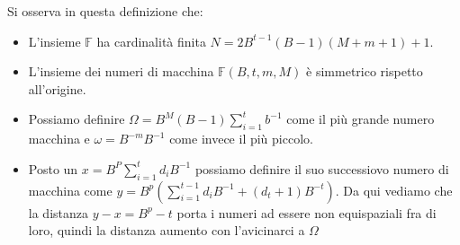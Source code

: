 \hspace{-15pt}Si osserva in questa definizione che:
\begin{itemize}
    \item L'insieme \(\mathbb{F}\) ha cardinalità finita \(N = 2B^{t-1}(B-1)(M + m + 1) + 1\).
    \item L'insieme dei numeri di macchina \(\mathbb{F}(B, t, m, M)\) è simmetrico rispetto all'origine.
    \item Possiamo definire \(\Omega = B^M (B-1) \sum_{i=1}^{t} b^{-1}\) come il più grande numero macchina e \(\omega = B^{-m} B^{-1}\) come
    invece il più piccolo.
    \item Posto un \(x = B^P \sum_{i=1}^{t}d_i B^{-1}\) possiamo definire il suo successiovo numero di macchina come
    \(y = B^p(\sum_{i=1}^{t-1}d_i B^{-1} + (d_t + 1)B^{-t})\). Da qui vediamo che la distanza \(y - x = B^p - t\) porta
    i numeri ad essere non equispaziali fra di loro, quindi la distanza aumento con l'avicinarci a \(\Omega\)
\end{itemize}